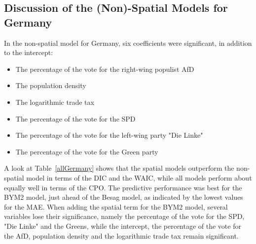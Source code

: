 \subsection{Discussion of the (Non)-Spatial Models for Germany}
In the non-spatial model for Germany, six coefficients were significant, in addition to the intercept:
\begin{itemize}
    \item The percentage of the vote for the right-wing populist AfD
    \item The population density
    \item The logarithmic trade tax
    \item The percentage of the vote for the SPD
    \item The percentage of the vote for the left-wing party "Die Linke"
    \item The percentage of the vote for the Green party
\end{itemize}
A look at Table~\ref{allGermany} shows that the spatial models outperform the non-spatial model in terms of the DIC and the WAIC, while all models perform about equally well in terms of the CPO. The predictive performance was best for the BYM2 model, just ahead of the Besag model, as indicated by the lowest values for the MAE. When adding the spatial term for the BYM2 model, several variables lose their significance, namely the percentage of the vote for the SPD, "Die Linke" and the Greens, while the intercept, the percentage of the vote for the AfD, population density and the logarithmic trade tax remain significant. \\
